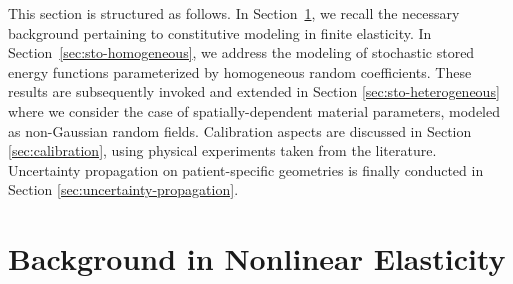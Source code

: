 This section is structured as follows. In Section~\ref{sec:background-det-nonlin}, we recall the necessary background pertaining to constitutive modeling in finite elasticity. In Section~\ref{sec:sto-homogeneous}, we address the modeling of stochastic stored energy functions parameterized by homogeneous random coefficients. These results are subsequently invoked and extended in Section \ref{sec:sto-heterogeneous} where we consider the case of spatially-dependent material parameters, modeled as non-Gaussian random fields. Calibration aspects are discussed in Section \ref{sec:calibration}, using physical experiments taken from the literature. Uncertainty propagation on patient-specific geometries is finally conducted in Section \ref{sec:uncertainty-propagation}.

\section{Background in Nonlinear Elasticity}
\label{sec:background-det-nonlin}


